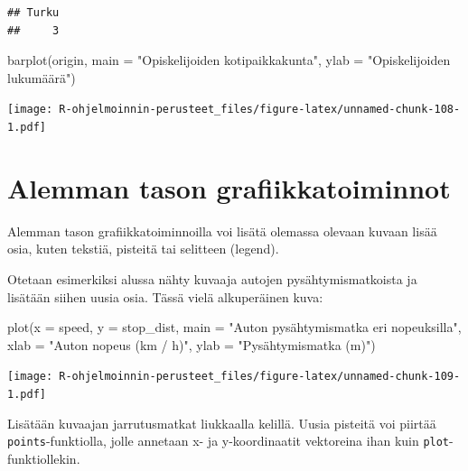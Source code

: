 \documentclass[
]{book}
\newenvironment{Shaded}{\begin{snugshade}}{\end{snugshade}}
\newcommand{\AttributeTok}[1]{\textcolor[rgb]{0.77,0.63,0.00}{#1}}
\newcommand{\FunctionTok}[1]{\textcolor[rgb]{0.00,0.00,0.00}{#1}}
\newcommand{\NormalTok}[1]{#1}
\newcommand{\StringTok}[1]{\textcolor[rgb]{0.31,0.60,0.02}{#1}}
\begin{document}
\begin{verbatim}
## Turku 
##     3
\end{verbatim}

\begin{Shaded}
\begin{Highlighting}[]
\FunctionTok{barplot}\NormalTok{(origin, }
        \AttributeTok{main =} \StringTok{"Opiskelijoiden kotipaikkakunta"}\NormalTok{,}
        \AttributeTok{ylab =} \StringTok{"Opiskelijoiden lukumäärä"}\NormalTok{)}
\end{Highlighting}
\end{Shaded}

\texttt{[image: R-ohjelmoinnin-perusteet\_files/figure-latex/unnamed-chunk-108-1.pdf]}

\hypertarget{alemman-tason-grafiikkatoiminnot}{%
\section{Alemman tason grafiikkatoiminnot}\label{alemman-tason-grafiikkatoiminnot}}

Alemman tason grafiikkatoiminnoilla voi lisätä olemassa olevaan kuvaan lisää osia, kuten tekstiä, pisteitä tai selitteen (legend).

Otetaan esimerkiksi alussa nähty kuvaaja autojen pysähtymismatkoista ja lisätään siihen uusia osia. Tässä vielä alkuperäinen kuva:

\begin{Shaded}
\begin{Highlighting}[]
\FunctionTok{plot}\NormalTok{(}\AttributeTok{x =}\NormalTok{ speed, }\AttributeTok{y =}\NormalTok{ stop\_dist,}
     \AttributeTok{main =} \StringTok{"Auton pysähtymismatka eri nopeuksilla"}\NormalTok{,}
     \AttributeTok{xlab =} \StringTok{"Auton nopeus (km / h)"}\NormalTok{, }\AttributeTok{ylab =} \StringTok{"Pysähtymismatka (m)"}\NormalTok{)}
\end{Highlighting}
\end{Shaded}

\texttt{[image: R-ohjelmoinnin-perusteet\_files/figure-latex/unnamed-chunk-109-1.pdf]}

Lisätään kuvaajan jarrutusmatkat liukkaalla kelillä. Uusia pisteitä voi piirtää \texttt{points}-funktiolla, jolle annetaan x- ja y-koordinaatit vektoreina ihan kuin \texttt{plot}-funktiollekin.
\end{document}
